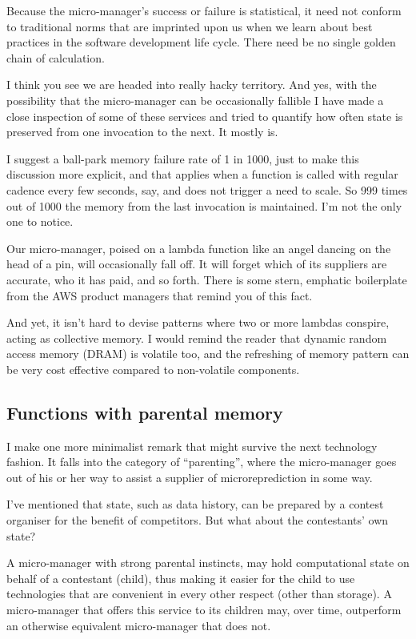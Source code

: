 Because the micro-manager's success or failure is statistical, it need not conform to traditional norms that are imprinted upon us when we learn about best practices in the software development life cycle. There need be no single golden chain of calculation. 


I think you see we are headed into really hacky territory. And yes, with the possibility that the micro-manager can be occasionally fallible I have made a close inspection of some of these services and tried to quantify how often state is preserved from one invocation to the next. It mostly is.


I suggest a ball-park memory failure rate of 1 in 1000, just to make this discussion more explicit, and that applies when a function is called with regular cadence every few seconds, say, and does not trigger a need to scale. So 999 times out of 1000 the memory from the last invocation is maintained. I'm not the only one to notice. 


Our micro-manager, poised on a lambda function like an angel dancing on the head of a pin, will occasionally fall off. It will forget which of its suppliers are accurate, who it has paid, and so forth. There is some stern, emphatic boilerplate from the AWS product managers that remind you of this fact. 


And yet, it isn't hard to devise patterns where two or more lambdas conspire, acting as collective memory. I would remind the reader that dynamic random access memory (DRAM) is volatile too, and the refreshing of memory pattern can be very cost effective compared to non-volatile components. 



\subsection{Functions with parental memory}

I make one more minimalist remark that might survive the next technology fashion. It falls into the category of ``parenting'', where the micro-manager goes out of his or her way to assist a supplier of microreprediction in some way. 

I've mentioned that state, such as data history, can be prepared by a contest organiser for the benefit of competitors. But what about the contestants' own state? 

A micro-manager with strong parental instincts, may hold computational state on behalf of a contestant (child), thus making it easier for the child to use technologies that are convenient in every other respect (other than storage). A micro-manager that offers this service to its children may, over time, outperform an otherwise equivalent micro-manager that does not. 

